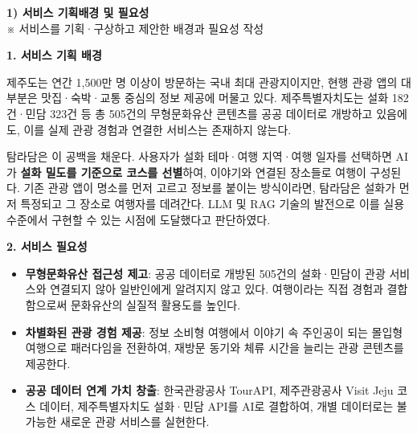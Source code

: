 \documentclass[12pt,a4paper]{article}
\newcommand{\sectionheader}[2]{%
  \vspace{3mm}%
  \noindent\colorbox{sectiongray}{%
    \parbox{\dimexpr\textwidth-2\fboxsep\relax}{%
      \vspace{2pt}%
      \textbf{#1}\\%
      {\small #2}%
      \vspace{2pt}%
    }%
  }%
  \vspace{2mm}%
}
\begin{document}
\noindent\colorbox{headerblue}{%
  \parbox{\dimexpr\textwidth-2\fboxsep\relax}{%
    \vspace{6pt}%
    \vspace{6pt}%
  }%
}

\vspace{2mm}

\noindent{}

\vspace{3mm}

\sectionheader{1) 서비스 기획배경 및 필요성}{※ 서비스를 기획·구상하고 제안한 배경과 필요성 작성}

\textbf{1. 서비스 기획 배경}

제주도는 연간 1,500만 명 이상이 방문하는 국내 최대 관광지이지만, 현행 관광 앱의 대부분은 맛집·숙박·교통 중심의 정보 제공에 머물고 있다. 제주특별자치도는 설화 182건·민담 323건 등 총 505건의 무형문화유산 콘텐츠를 공공 데이터로 개방하고 있음에도, 이를 실제 관광 경험과 연결한 서비스는 존재하지 않는다.

탐라담은 이 공백을 채운다. 사용자가 설화 테마·여행 지역·여행 일자를 선택하면 AI가 \textbf{설화 밀도를 기준으로 코스를 선별}하여, 이야기와 연결된 장소들로 여행이 구성된다. 기존 관광 앱이 명소를 먼저 고르고 정보를 붙이는 방식이라면, 탐라담은 설화가 먼저 특정되고 그 장소로 여행자를 데려간다. LLM 및 RAG 기술의 발전으로 이를 실용 수준에서 구현할 수 있는 시점에 도달했다고 판단하였다.

\vspace{2mm}
\textbf{2. 서비스 필요성}

\begin{itemize}
  \item \textbf{무형문화유산 접근성 제고}: 공공 데이터로 개방된 505건의 설화·민담이 관광 서비스와 연결되지 않아 일반인에게 알려지지 않고 있다. 여행이라는 직접 경험과 결합함으로써 문화유산의 실질적 활용도를 높인다.
  \item \textbf{차별화된 관광 경험 제공}: 정보 소비형 여행에서 이야기 속 주인공이 되는 몰입형 여행으로 패러다임을 전환하여, 재방문 동기와 체류 시간을 늘리는 관광 콘텐츠를 제공한다.
  \item \textbf{공공 데이터 연계 가치 창출}: 한국관광공사 TourAPI, 제주관광공사 Visit Jeju 코스 데이터, 제주특별자치도 설화·민담 API를 AI로 결합하여, 개별 데이터로는 불가능한 새로운 관광 서비스를 실현한다.
\end{itemize}
\end{document}
